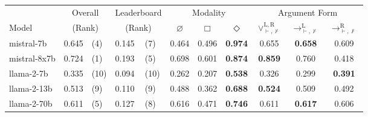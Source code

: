 \iffalse
    \begin{tabular}{
        @{}lllllcccccc@{}
        }
        \toprule
                     & \multicolumn{2}{c}{Overall} & \multicolumn{2}{c}{Leaderboard} & \multicolumn{3}{c}{Modality} & \multicolumn{3}{c}{Argument Form}                                                                                                                                                                             \\
        \cmidrule(lr){6-8} \cmidrule(lr){9-11}
        Model        & \multicolumn{2}{c}{(Rank)}  & \multicolumn{2}{c}{(Rank)}      & $\varnothing$                & $\Box$                            & $\Diamond$ & $\lor^{\mathrm{L},\mathrm{R}}_{\vdash, \nvdash}$ & $\to^\mathrm{L}_{\vdash, \nvdash}$ & $\to^\mathrm{R}_{\vdash, \nvdash}$                                   \\
        \midrule
        mistral-7b   & 0.645                       & (4)                             & 0.145                        & (7)                               & 0.464      & 0.496                                            & \textbf{0.974}                     & 0.655                              & \textbf{0.658} & 0.609          \\
        mistral-8x7b & 0.724                       & (1)                             & 0.193                        & (5)                               & 0.698      & 0.601                                            & \textbf{0.874}                     & \textbf{0.859}                     & 0.760          & 0.418          \\
        llama-2-7b   & 0.335                       & (10)                            & 0.094                        & (10)                              & 0.262      & 0.207                                            & \textbf{0.538}                     & 0.326                              & 0.299          & \textbf{0.391} \\
        llama-2-13b  & 0.513                       & (9)                             & 0.110                        & (9)                               & 0.488      & 0.362                                            & \textbf{0.688}                     & \textbf{0.524}                     & 0.509          & 0.492          \\
        llama-2-70b  & 0.611                       & (5)                             & 0.127                        & (8)                               & 0.616      & 0.471                                            & \textbf{0.746}                     & 0.611                              & \textbf{0.617} & 0.606          \\

\end{tabular}

